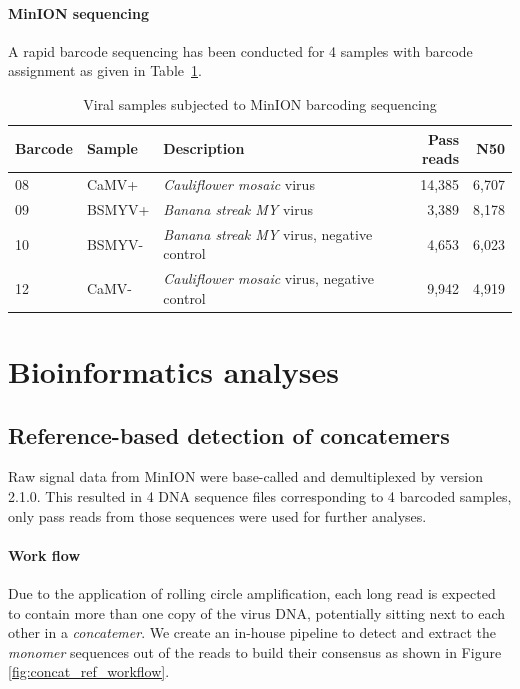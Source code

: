 \paragraph{MinION sequencing}
A rapid barcode sequencing has been conducted for 4 samples with barcode assignment as given in Table~\ref{tab:viral_samples}.
\begin{table}[!hpt]
\centering
\caption{Viral samples subjected to MinION barcoding sequencing}
\label{tab:viral_samples}
\begin{tabular}{|l|l|l|r|r|}
\hline
\textbf{Barcode} & \textbf{Sample} & \textbf{Description} & \textbf{Pass reads}  & \textbf{N50}    \\\hline
08                  & CaMV+              & \emph{Cauliflower mosaic} virus  &   14,385   &      6,707 \\\hline
09                  & BSMYV+             & \emph{Banana streak MY} virus    &   3,389   &   8,178   \\\hline        
10                  & BSMYV-             & \emph{Banana streak MY} virus, negative control     &   4,653   &  6,023   \\\hline
12                  & CaMV-              & \emph{Cauliflower mosaic} virus, negative control     &   9,942   &  4,919   \\\hline
\end{tabular}
\end{table}
\section{Bioinformatics analyses}
\subsection{Reference-based detection of concatemers}
Raw signal data from MinION were base-called and demultiplexed by \albacore{} version 2.1.0. This resulted in 4 DNA sequence files corresponding to 4 barcoded samples, only pass reads from those sequences were used for further analyses.

\paragraph{Work flow} Due to the application of rolling circle amplification, each long read is expected to contain more than one copy of the virus DNA, potentially sitting next to each other in a \emph{concatemer}. We create an in-house pipeline to detect and extract the \emph{monomer} sequences out of the reads to build their consensus as shown in Figure \ref{fig:concat_ref_workflow}.

